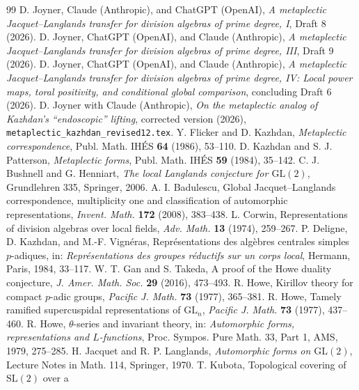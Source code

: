 \documentclass[11pt]{article}
\theoremstyle{plain}
\theoremstyle{definition}
\begin{document}
\begin{thebibliography}{99}
 D. Joyner, Claude (Anthropic), and ChatGPT (OpenAI),
\emph{A metaplectic Jacquet--Langlands transfer for division
algebras of prime degree, I}, Draft 8 (2026).
 D. Joyner, ChatGPT (OpenAI), and Claude (Anthropic),
\emph{A metaplectic Jacquet--Langlands transfer for division
algebras of prime degree, III}, Draft 9 (2026).
 D. Joyner, ChatGPT (OpenAI), and Claude (Anthropic),
\emph{A metaplectic Jacquet--Langlands transfer for division
algebras of prime degree, IV: Local power maps, toral positivity,
and conditional global comparison}, concluding Draft 6 (2026).
 D. Joyner with Claude (Anthropic),
\emph{On the metaplectic analog of Kazhdan's ``endoscopic'' lifting},
corrected version (2026), \texttt{metaplectic\_kazhdan\_revised12.tex}.
 Y. Flicker and D. Kazhdan,
\emph{Metaplectic correspondence}, Publ. Math. IH\'ES
\textbf{64} (1986), 53--110.
 D. Kazhdan and S. J. Patterson, \emph{Metaplectic forms},
Publ. Math. IH\'ES \textbf{59} (1984), 35--142.
 C. J. Bushnell and G. Henniart, \emph{The local Langlands
conjecture for $\mathrm{GL}(2)$}, Grundlehren 335, Springer, 2006.
 A. I. Badulescu, Global Jacquet--Langlands correspondence,
multiplicity one and classification of automorphic representations,
\emph{Invent. Math.} \textbf{172} (2008), 383--438.
 L. Corwin, Representations of division algebras over local
fields, \emph{Adv. Math.} \textbf{13} (1974), 259--267.
 P. Deligne, D. Kazhdan, and M.-F. Vign\'eras,
Repr\'esentations des alg\`ebres centrales simples $p$-adiques, in:
\emph{Repr\'esentations des groupes r\'eductifs sur un corps local},
Hermann, Paris, 1984, 33--117.
 W. T. Gan and S. Takeda, A proof of the Howe duality
conjecture, \emph{J. Amer. Math. Soc.} \textbf{29} (2016), 473--493.
 R. Howe, Kirillov theory for compact $p$-adic groups,
\emph{Pacific J. Math.} \textbf{73} (1977), 365--381.
 R. Howe, Tamely ramified supercuspidal representations
of $\mathrm{GL}_n$, \emph{Pacific J. Math.} \textbf{73} (1977), 437--460.
 R. Howe, $\theta$-series and invariant theory, in:
\emph{Automorphic forms, representations and $L$-functions}, Proc.
Sympos. Pure Math. 33, Part 1, AMS, 1979, 275--285.
 H. Jacquet and R. P. Langlands, \emph{Automorphic forms on
$\mathrm{GL}(2)$}, Lecture Notes in Math. 114, Springer, 1970.
 T. Kubota, Topological covering of $\mathrm{SL}(2)$ over a

\end{thebibliography}
\end{document}

